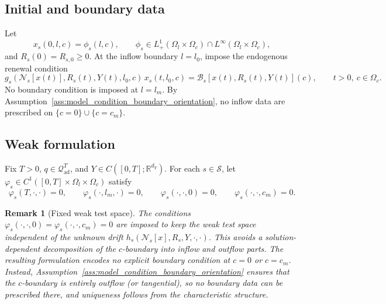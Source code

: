 \documentclass[pdflatex,sn-mathphys-num]{sn-jnl}%
\newtheorem{remark}[theorem]{Remark}
\begin{document}
\subsection{Initial and boundary data}
Let
\begin{equation}\label{eq:model_initial_condition}
x_s(0,l,c)=\phi_s(l,c),
\qquad
\phi_s\in L^1_+(\Omega_l\times\Omega_c)\cap L^\infty(\Omega_l\times\Omega_c),
\end{equation}
and \(R_s(0)=R_{s,0}\ge 0\).
At the inflow boundary \(l=l_0\), impose the endogenous renewal condition
\begin{equation}\label{eq:model_recruitment_bc}
g_s(\mathcal N_s[x(t)],R_s(t),Y(t),l_0,c)\,x_s(t,l_0,c)
=
\mathcal B_s[x(t),R_s(t),Y(t)](c),
\qquad
t>0,\ c\in\Omega_c.
\end{equation}
No boundary condition is imposed at \(l=l_m\). By Assumption~\ref{ass:model_condition_boundary_orientation}, no inflow data are prescribed on
\(\{c=0\}\cup\{c=c_m\}\).

\subsection{Weak formulation}
Fix \(T>0\), \(q\in\mathcal Q_{\mathrm{ad}}^T\), and
\(Y\in C([0,T];\mathbb R^{d_Y})\).
For each \(s\in\mathcal S\), let
\(\varphi_s\in C^1([0,T]\times\Omega_l\times\Omega_c)\)
satisfy
\begin{equation}\label{eq:model_test_function_bc}
\varphi_s(T,\cdot,\cdot)=0,
\qquad
\varphi_s(\cdot,l_m,\cdot)=0,
\qquad
\varphi_s(\cdot,\cdot,0)=0,
\qquad
\varphi_s(\cdot,\cdot,c_m)=0.
\end{equation}

\begin{remark}[Fixed weak test space]\label{rem:test_space}
The conditions
\(\varphi_s(\cdot,\cdot,0)=\varphi_s(\cdot,\cdot,c_m)=0\)
are imposed to keep the weak test space \emph{independent of the unknown drift}
\(h_s(\mathcal N_s[x],R_s,Y,\cdot,\cdot)\). This avoids a solution-dependent
decomposition of the \(c\)-boundary into inflow and outflow parts. The resulting
formulation encodes no explicit boundary condition at \(c=0\) or \(c=c_m\). Instead,
Assumption~\ref{ass:model_condition_boundary_orientation} ensures that the \(c\)-boundary is
entirely outflow (or tangential), so no boundary data can be prescribed there, and uniqueness follows from the characteristic structure.
\end{remark}
\end{document}

